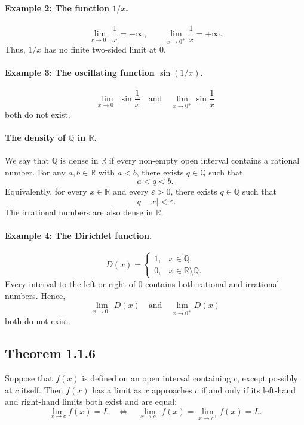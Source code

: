 \documentclass[12pt]{article}
\begin{document}
\paragraph{Example 2: The function $1/x$.}
\[
\lim_{x\to0^-}\frac{1}{x}=-\infty,
\qquad
\lim_{x\to0^+}\frac{1}{x}=+\infty.
\]
Thus, $1/x$ has no finite two-sided limit at $0$.

\paragraph{Example 3: The oscillating function $\sin(1/x)$.}
\[
\lim_{x\to0^-}\sin\frac{1}{x}
\quad\text{and}\quad
\lim_{x\to0^+}\sin\frac{1}{x}
\]
both do not exist.

\paragraph{The density of $\mathbb{Q}$ in $\mathbb{R}$.}

We say that $\mathbb{Q}$ is dense in $\mathbb{R}$ if every non-empty open
interval contains a rational number. For any $a,b\in\mathbb{R}$ with $a<b$,
there exists $q\in\mathbb{Q}$ such that
\[
a<q<b.
\]
Equivalently, for every $x\in\mathbb{R}$ and every $\varepsilon>0$, there
exists $q\in\mathbb{Q}$ such that
\[
|q-x|<\varepsilon.
\]
The irrational numbers are also dense in $\mathbb{R}$.

\paragraph{Example 4: The Dirichlet function.}
\[
D(x)=
\begin{cases}
1, & x\in\mathbb{Q},\\
0, & x\in\mathbb{R}\setminus\mathbb{Q}.
\end{cases}
\]
Every interval to the left or right of $0$ contains both rational and
irrational numbers. Hence,
\[
\lim_{x\to0^-}D(x)
\quad\text{and}\quad
\lim_{x\to0^+}D(x)
\]
both do not exist.

\subsection*{Theorem 1.1.6}

Suppose that $f(x)$ is defined on an open interval containing $c$, except
possibly at $c$ itself. Then $f(x)$ has a limit as $x$ approaches $c$ if and
only if its left-hand and right-hand limits both exist and are equal:
\[
\lim_{x\to c}f(x)=L
\quad\Longleftrightarrow\quad
\lim_{x\to c^-}f(x)=\lim_{x\to c^+}f(x)=L.
\]
\end{document}
